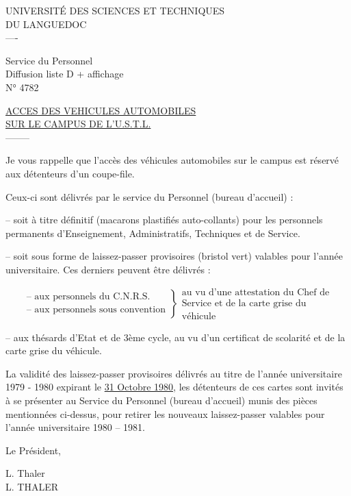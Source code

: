 UNIVERSITÉ DES SCIENCES ET TECHNIQUES\\
DU LANGUEDOC\\
----

Service du Personnel\\
Diffusion liste D + affichage\\
N° 4782

\uline{ACCES DES VEHICULES AUTOMOBILES}\\
\uline{SUR LE CAMPUS DE L'U.S.T.L.}\\
--------

Je vous rappelle que l'accès des véhicules automobiles sur le campus est réservé aux détenteurs d'un coupe-file.

Ceux-ci sont délivrés par le service du Personnel (bureau d'accueil) :

-- soit à titre définitif (macarons plastifiés auto-collants) pour les personnels permanents d'Enseignement, Administratifs, Techniques et de Service.

-- soit sous forme de laissez-passer provisoires (bristol vert) valables pour l'année universitaire. Ces derniers peuvent être délivrés :

\[
\left.\begin{array}{l}
\text{-- aux personnels du C.N.R.S.}\\
\text{-- aux personnels sous convention}
\end{array}\right\}
\begin{array}{l}
\text{au vu d'une attestation du Chef de}\\
\text{Service et de la carte grise du}\\
\text{véhicule}
\end{array}
\]

-- aux thésards d'Etat et de 3ème cycle, au vu d'un certificat de scolarité et de la carte grise du véhicule.

La validité des laissez-passer provisoires délivrés au titre de l'année universitaire 1979 - 1980 expirant le \uline{31 Octobre 1980,} les détenteurs de ces cartes sont invités à se présenter au Service du Personnel (bureau d'accueil) munis des pièces mentionnées ci-dessus, pour retirer les nouveaux laissez-passer valables pour l'année universitaire 1980 -- 1981.

Le Président,

L. Thaler\\
L. THALER


